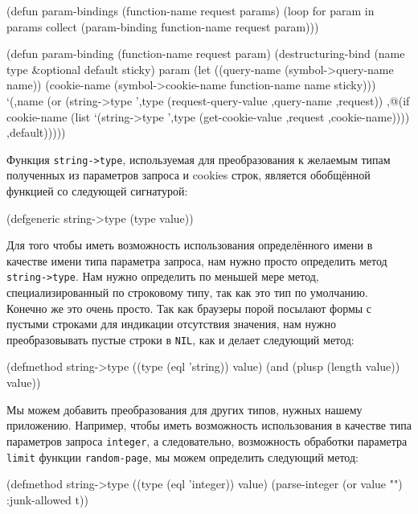 \begin{myverb}
  (defun param-bindings (function-name request params)
    (loop for param in params
       collect (param-binding function-name request param)))

  (defun param-binding (function-name request param)
    (destructuring-bind (name type &optional default sticky) param
      (let ((query-name (symbol->query-name name))
            (cookie-name (symbol->cookie-name function-name name sticky)))
        `(,name (or 
                 (string->type ',type (request-query-value ,query-name ,request))
                 ,@(if cookie-name
                       (list `(string->type ',type (get-cookie-value ,request ,cookie-name))))
                 ,default)))))
\end{myverb}

Функция \lstinline!string->type!, используемая для преобразования к желаемым типам
полученных из параметров запроса и cookies строк, является обобщённой функцией со
следующей сигнатурой:

\begin{myverb}
  (defgeneric string->type (type value))
\end{myverb}

Для того чтобы иметь возможность использования определённого имени в качестве имени типа
параметра запроса, нам нужно просто определить метод \lstinline!string->type!. Нам нужно
определить по меньшей мере метод, специализированный по строковому типу, так как это тип
по умолчанию. Конечно же это очень просто. Так как браузеры порой посылают формы с пустыми
строками для индикации отсутствия значения, нам нужно преобразовывать пустые строки в
\lstinline{NIL}, как и делает следующий метод:

\begin{myverb}
  (defmethod string->type ((type (eql 'string)) value)
    (and (plusp (length value)) value))
\end{myverb}

Мы можем добавить преобразования для других типов, нужных нашему приложению. Например,
чтобы иметь возможность использования в качестве типа параметров запроса \lstinline{integer}, а
следовательно, возможность обработки параметра \lstinline{limit} функции \lstinline{random-page}, мы
можем определить следующий метод:

\begin{myverb}
  (defmethod string->type ((type (eql 'integer)) value)
    (parse-integer (or value "") :junk-allowed t))
\end{myverb}

